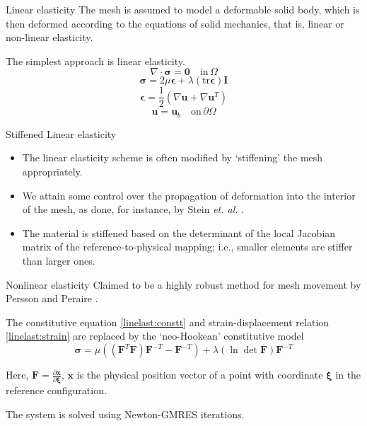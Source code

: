 \documentclass[t,12pt]{beamer}
\let\bld\boldsymbol
\begin{document}
\begin{frame}{Linear elasticity}
  The mesh is assumed to model a deformable solid body, which is then deformed according to the equations of solid mechanics, that is, linear or non-linear elasticity.
  
  The simplest approach is linear elasticity.
  \begin{equation}
  \nabla \cdot \bld{\sigma}  = \mathbf{0} \quad \text{in} \, \Omega
  \end{equation}
  \begin{equation}
  \bld{\sigma} = 2\mu\bld{\epsilon} + \lambda (\mathrm{tr}\boldsymbol{\epsilon}) \bld{I}
  \label{linelast:constt}
  \end{equation}
  \begin{equation}
  \bld{\epsilon} = \frac12 (\nabla\bld{u}+\nabla\bld{u}^T)
  \label{linelast:strain}
  \end{equation}
  \begin{equation}
  \bld{u} = \bld{u}_b \quad \text{on} \, \partial\Omega
  \end{equation}
\end{frame}

\begin{frame}{Stiffened Linear elasticity}
	\begin{itemize}
	\item The linear elasticity scheme is often modified by `stiffening' the mesh appropriately. 
	\item We attain some control over the propagation of deformation into the interior of the mesh, as done, for instance, by Stein \emph{et. al.} .
	\item The material is stiffened based on the determinant of the local Jacobian matrix of the reference-to-physical mapping; i.e., smaller elements are stiffer than larger ones.
	\end{itemize}
\end{frame}

\begin{frame}{Nonlinear elasticity}
Claimed to be a highly robust method for mesh movement by Persson and Peraire . 

The constitutive equation \eqref{linelast:constt} and strain-displacement relation \eqref{linelast:strain} are replaced by the `neo-Hookean' constitutive model
\begin{equation}
\bld{\sigma} = \mu ((\boldsymbol{F}^T\bld{F})\bld{F}^{-T} - \bld{F}^{-T}) + \lambda(\ln \det\bld{F})\bld{F}^{-T}
\end{equation}

Here, $\bld{F} = \frac{\partial\bld{x}}{\partial\bld{\xi}}$, $\bld{x}$ is the physical position vector of a point with coordinate $\bld{\xi}$ in the reference configuration. 

The system is solved using Newton-GMRES iterations.
\end{frame}
\end{document}
